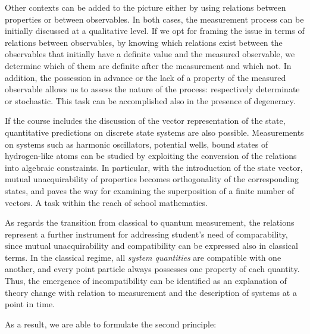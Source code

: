 \documentclass[twocolumn,secnumarabic,amssymb, nobibnotes, aps, prd, nofootinbib]{revtex4-2}
\begin{document}
Other contexts can be added to the picture either by using relations between properties or between observables. In both cases, the measurement process can be initially discussed at a qualitative level. If we opt for framing the issue in terms of relations between observables, by knowing which relations exist between the observables that initially have a definite value and the measured observable, we determine which of them are definite after the measurement and which not. In addition, the possession in advance or the lack of a property of the measured observable allows us to assess the nature of the process: respectively determinate or stochastic. This task can be accomplished also in the presence of degeneracy.

If the course includes the discussion of the vector representation of the state, quantitative predictions on discrete state systems are also possible. Measurements on systems such as harmonic oscillators, potential wells, bound states of hydrogen-like atoms can be studied by exploiting the conversion of the relations into algebraic constraints. In particular, with the introduction of the state vector, mutual unacquirability of properties becomes orthogonality of the corresponding states, and paves the way for examining the superposition of a finite number of vectors. A task within the reach of school mathematics.

As regards the transition from classical to quantum measurement, the relations represent a further instrument for addressing student's need of comparability, since mutual unacquirability and compatibility can be expressed also
in classical terms. In the classical regime, all \emph{system quantities} are compatible with one another, and every point particle always possesses one property of each quantity. Thus, the emergence of incompatibility can be identified as an explanation of theory change with relation to measurement and the description of systems at a point in time.

As a result, we are able to formulate the second principle:\\

\centerline{}
\end{document}
